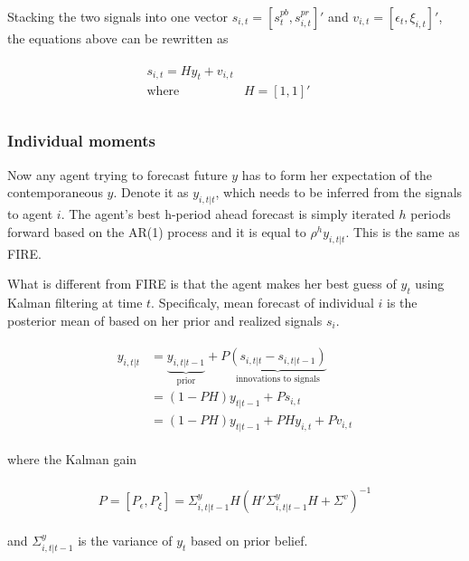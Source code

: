 \documentclass[]{article}
\begin{document}
Stacking the two signals into one vector $s_{i,t} = [s^{pb}_t,s^{pr}_{i,t}]'$ and $v_{i,t}= [\epsilon_t,\xi_{i,t}]'$, the equations above can be rewritten as 

\begin{eqnarray}
\begin{aligned}
s_{i,t} = H y_{t} + v_{i,t} \\
\text{where } & H=[1,1]' \quad \\
\end{aligned}
\end{eqnarray}


\subsubsection{Individual moments }

Now any agent trying to forecast future $y$ has to form her expectation of the contemporaneous $y$. Denote it as  $y_{i,t|t}$, which needs to be inferred from the signals to agent $i$. The agent's best h-period ahead forecast is simply iterated $h$ periods forward based on the AR(1) process and it is equal to $\rho^h y_{i,t|t}$. This is the same as FIRE.

What is different from FIRE is that the agent makes her best guess of $y_t$ using Kalman filtering at time $t$. Specificaly, mean forecast of individual $i$ is the posterior mean of based on her prior and realized signals $s_i$. 


\begin{eqnarray}
\begin{aligned}
y_{i,t|t}  
& =  \underbrace{y_{i,t|t-1}}_{\text{prior}} + P \underbrace {(s_{i,t|t}-s_{i,t|t-1})}_{\text{innovations to signals}} \\
& = (1-PH) y_{t|t-1} + Ps_{i,t} \\
& = (1-PH) y_{t|t-1} + PH y_{i,t} + P v_{i,t} 
\end{aligned}
\end{eqnarray}

where the Kalman gain  


\begin{eqnarray}
\begin{aligned}
 P = [P_\epsilon,P_\xi]= \Sigma^y_{i,t|t-1} H(H'\Sigma^y_{i,t|t-1} H + \Sigma^v)^{-1} 
 \end{aligned}
 \end{eqnarray}
 
and $\Sigma^y_{i,t|t-1}$  is the variance of  $y_t$ based on prior belief.
\end{document}

